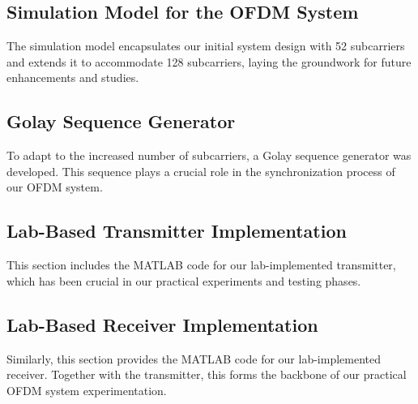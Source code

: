 \documentclass{article}
\begin{document}
\subsection*{Simulation Model for the OFDM System}
The simulation model encapsulates our initial system design with 52 subcarriers and extends it to accommodate 128 subcarriers, laying the groundwork for future enhancements and studies.


\subsection*{Golay Sequence Generator}
To adapt to the increased number of subcarriers, a Golay sequence generator was developed. This sequence plays a crucial role in the synchronization process of our OFDM system.


\subsection*{Lab-Based Transmitter Implementation}
This section includes the MATLAB code for our lab-implemented transmitter, which has been crucial in our practical experiments and testing phases.


\subsection*{Lab-Based Receiver Implementation}
Similarly, this section provides the MATLAB code for our lab-implemented receiver. Together with the transmitter, this forms the backbone of our practical OFDM system experimentation.

\end{document}
